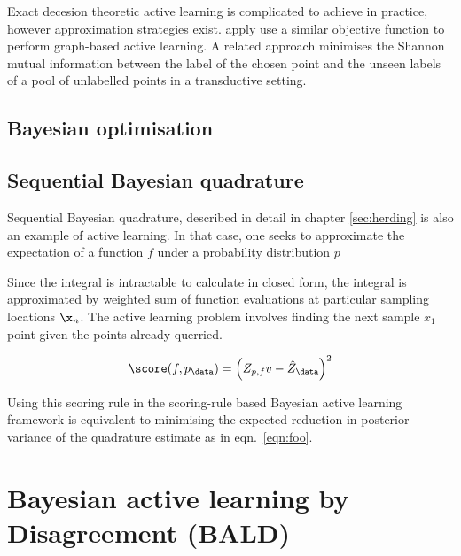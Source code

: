 Exact decesion theoretic active learning is complicated to achieve in practice, however approximation strategies exist. \citet{} apply \citet{ZhuGhahramani} use a similar objective function to perform graph-based active learning.
A related approach minimises the Shannon mutual information between the label of the chosen point and the unseen labels of a pool of unlabelled points in a transductive setting.

\subsection{Bayesian optimisation}

\subsection{Sequential Bayesian quadrature}

Sequential Bayesian quadrature, described in detail in chapter \ref{sec:herding} is also an example of active learning. In that case, one seeks to approximate the expectation of a function $f$ under a probability distribution $p$

Since the integral is intractable to calculate in closed form, the integral is approximated by weighted sum of function evaluations at particular sampling locations $\x_n$. The active learning problem involves finding the next sample $x_1$ point given the points already querried.

\begin{equation}
	\score(f,p_\data) = \left(Z_{p,f}v - \hat{Z}_\data \right)^2
\end{equation}

Using this scoring rule in the scoring-rule based Bayesian active learning framework is equivalent to minimising the expected reduction in posterior variance of the quadrature estimate as in eqn.\ \eqref{eqn:foo}.

\section{Bayesian active learning by Disagreement (BALD)}